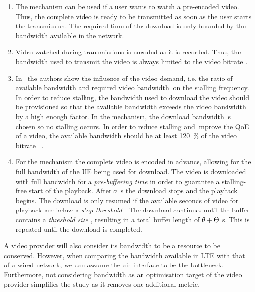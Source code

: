 \begin{enumerate}
\item \textbf{\download} The \emph{\download} mechanism can be used if a user wants to watch a pre-encoded video.
Thus, the complete video is ready to be transmitted as soon as the user starts the transmission.
The required time of the download is only bounded by the bandwidth available in the network.

\item \textbf{\live} Video watched during \emph{\live} transmissions is encoded as it is recorded.
Thus, the bandwidth used to transmit the video is always limited to the video bitrate \bitrate.

\item \textbf{\serviceprovisioning} In~\cite{Hossfeld2011a} the authors show the influence of the video demand, i.e. the ratio of available bandwidth and required video bandwidth, on the stalling frequency.
In order to reduce stalling, the bandwidth used to download the video should be provisioned so that the available bandwidth exceeds the video bandwidth by a high enough factor.
In the \emph{\serviceprovisioning} mechanism, the download bandwidth is chosen so no stalling occurs.
In order to reduce stalling and improve the \gls{QoE} of a video, the available bandwidth should be at least \SI{120}{\percent} of the video bitrate \bitrate~\cite{Hossfeld13a}.

\item \textbf{\streaming} For the \emph{\streaming} mechanism the complete video is encoded in advance, allowing for the full bandwidth of the \gls{UE} being used for download.
The video is downloaded with full bandwidth for a \emph{pre-buffering time} \streamingstart in order to guarantee a stalling-free start of the playback.
After \(\sigma\) \si{\second} the download stops and the playback begins.
The download is only resumed if the available seconds of video for playback are below a \emph{stop threshold} \bufferlower.
The download continues until the buffer contains a \emph{threshold size} \buffersize, resulting in a total buffer length of \(\theta + \Theta\) \si{\second}.
This is repeated until the download is completed.
\end{enumerate}

A video provider will also consider its bandwidth to be a resource to be conserved.
However, when comparing the bandwidth available in \gls{LTE} with that of a wired network, we can assume the air interface to be the bottleneck.
Furthermore, not considering bandwidth as an optimisation target of the video provider simplifies the study as it removes one additional metric.

